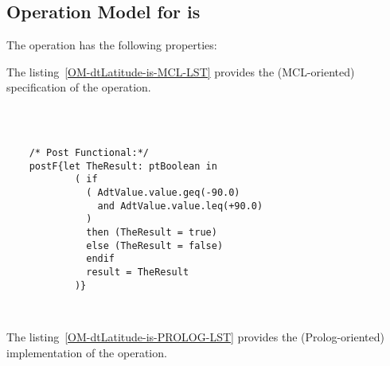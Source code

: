 \subsection{Operation Model for is}

\label{OM-is}


The  operation has the following properties:

	\begin{operationmodel}



		


	\end{operationmodel}



	\vspace{1cm}
	The listing~\ref{OM-dtLatitude-is-MCL-LST} provides the \msrmessir (MCL-oriented) specification of the operation.
	
	\scriptsize
	\vspace{0.5cm}
	\begin{lstlisting}[style=MessirStyle,firstnumber=auto,captionpos=b,caption={\msrmessir (MCL-oriented) specification of the operation \emph{is}.},label=OM-dtLatitude-is-MCL-LST]

	
	
	/* Post Functional:*/ 
	postF{let TheResult: ptBoolean in
	        ( if
	          ( AdtValue.value.geq(-90.0)
	            and AdtValue.value.leq(+90.0)
	          )
	          then (TheResult = true)
	          else (TheResult = false)
	          endif
	          result = TheResult
	        )}
	
	
	\end{lstlisting}
	\normalsize 
	
	
	
	
	
	\vspace{1cm}
	The listing~\ref{OM-dtLatitude-is-PROLOG-LST} provides the \msrmessir (Prolog-oriented) implementation of the operation.
	
	\scriptsize
	\vspace{0.5cm}
	
	
	\normalsize





